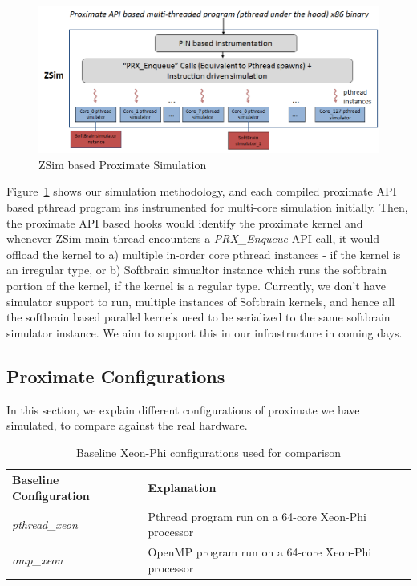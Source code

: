 \begin{figure}[h]
  \begin{center}
    \includegraphics[width=\linewidth]{cs758-figs/zsim-meth.png}
  \end{center}
\vspace{-0.2in}
  \caption{ZSim based Proximate Simulation}
  \label{fig:sim}
\vspace{-0.05in}
\end{figure}

Figure~\ref{fig:sim} shows our simulation methodology, and  each compiled
proximate API based pthread program ins instrumented for multi-core simulation initially.
Then, the proximate API based hooks would identify the proximate kernel and whenever ZSim main thread
encounters a \emph{PRX\_Enqueue} API call, it would offload the kernel to 
a) multiple in-order core pthread instances - if the kernel is an irregular type,  or b) Softbrain simualtor instance
which runs the softbrain portion of the kernel, if the kernel is a regular type. 
Currently, we don't have simulator support to run, multiple instances of Softbrain kernels, 
and hence all the softbrain based parallel kernels need to be serialized to the same softbrain
simulator instance. We aim to support this in our infrastructure in coming days. 

\subsection{Proximate Configurations}
In this section, we explain different configurations of proximate we have simulated, 
to compare against the real hardware. 

\begin{table}[h]
  \centering
  \begin{tabular}{|l|l|}
    \hline
    \textbf{Baseline Configuration} & \textbf{Explanation}                                \\ \hline
    \textit{pthread\_xeon}  & Pthread program run on a 64-core Xeon-Phi processor \\ \hline
    \textit{omp\_xeon}      & OpenMP program run on a 64-core Xeon-Phi processor  \\ \hline
  \end{tabular}
  \caption{Baseline Xeon-Phi configurations used for comparison}
  \label{tab:base-config}
\end{table}

